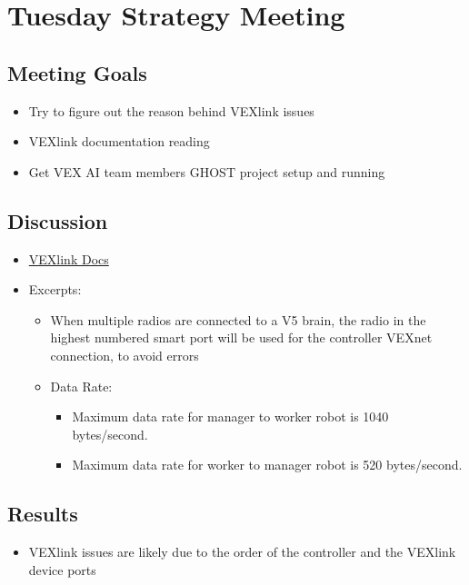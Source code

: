 \section{Tuesday Strategy Meeting}

\subsection{Meeting Goals}
\begin{itemize}
    \item Try to figure out the reason behind VEXlink issues
    \item VEXlink documentation reading
    \item Get VEX AI team members GHOST project setup and running
\end{itemize}

\subsection{Discussion}
\begin{itemize}
    \item \href{https://drive.google.com/file/d/13mTA6BT7CPskJzh4YgsfAfoH9OgK75Hn/view?pli=1}{VEXlink Docs}
    \item Excerpts:
    \begin{itemize}
        \item When multiple radios are connected to a V5 brain, the radio in the highest numbered smart port will be used for the controller VEXnet connection, to avoid errors
        \item Data Rate:
        \begin{itemize}
            \item Maximum data rate for manager to worker robot is 1040 bytes/second.
            \item Maximum data rate for worker to manager robot is 520 bytes/second.
        \end{itemize}
    \end{itemize}
\end{itemize}

\subsection{Results}
\begin{itemize}
    \item VEXlink issues are likely due to the order of the controller and the VEXlink device ports
\end{itemize}

